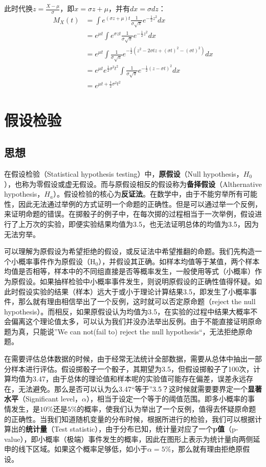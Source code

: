 \documentclass[11pt]{article}
\begin{document}
此时代换$z=\frac{X-\mu}{\sigma}$，即$x= \sigma z + \mu$，并有$dx=\sigma dz$：
\begin{align*}
    M_X(t) &= \int e^{(\sigma z + \mu)t} \frac{1}{\sigma\sqrt{\pi}} e^{-\frac{1}{2}z^2}dx \\
    &= e^{\mu t} \int e^{\sigma z t} \frac{1}{\sigma\sqrt{\pi}} e^{-\frac{1}{2}z^2}dx \\
    &= e^{\mu t} \int \frac{1}{\sigma\sqrt{\pi}} e^{-\frac{1}{2} (z^2 -2\sigma t z + (\sigma t)^2 -(\sigma t)^2)}dx \\
    &= e^{\mu t} e^{\frac{1}{2} \sigma^2 t^2} \int \frac{1}{\sigma\sqrt{\pi}} e^{-\frac{1}{2} (z - \sigma t)^2}dx \\
    &= e^{\mu t + \frac{1}{2} \sigma^2 t^2}
\end{align*}

\section{假设检验}

\subsection{思想}

在假设检验（Statistical hypothesis testing）中，\textbf{原假设}（Null hypothesis，$H_0$），也称为零假设或虚无假设。而与原假设相反的假设称为\textbf{备择假设}（Althernative hypothesis，$H_a$）。假设检验的核心为\textbf{反证法}。在数学中，由于不能穷举所有可能性，因此无法通过举例的方式证明一个命题的正确性。但是可以通过举一个反例，来证明命题的错误。在掷骰子的例子中，在每次掷的过程相当于一次举例，假设进行了上万次的实验，即便实验结果均值为3.5，也无法证明总体的均值为3.5，因为无法穷举。

可以理解为原假设为希望拒绝的假设，或反证法中希望推翻的命题。我们先构造一个小概率事件作为原假设（$\text{H}_0$），并假设其正确。如样本均值等于某值，两个样本均值是否相等，样本中的不同组直接是否等概率发生，一般使用等式（小概率）作为原假设。如果抽样检验中小概率事件发生，则说明原假设的正确性值得怀疑。如此时假设实验的结果（样本）远大于或小于理论计算结果3.5，即发生了小概率事件，那么就有理由相信举出了一个反例，这时就可以否定原命题（reject the null hypothesis）。而相反，如果原假设认为均值为3.5，在实验的过程中结果大概率不会偏离这个理论值太多，可以认为我们并没办法举出反例。由于不能直接证明原命题为真，只能说”We can not(fail to) reject the null hypothesis“，无法拒绝原命题。

在需要评估总体数据的时候，由于经常无法统计全部数据，需要从总体中抽出一部分样本进行评估。假设掷骰子一个骰子，其期望为3.5，但假设掷骰子了100次，计算均值为3.47，由于总体的理论值和样本呢的实验值可能存在偏差，误差永远存在，无法避免。那么是否可以认为么3.47“等于”3.5？这时候就需要要界定一个\textbf{显著水平}（Significant level，$\alpha$），相当于设定一个等于的阈值范围。即多小概率的事情发生，是$10\%$还是$5\%$的概率，使我们认为举出了一个反例，值得去怀疑原命题的正确性。当我们知道随机变量的分布时候，根据所进行的检验，我们可以根据计算出的\textbf{统计量}（Test statistic），由于分布已知，统计量对应了一个\textbf{p值}（p-value），即小概率（极端）事件发生的概率，因此在图形上表示为统计量向两侧延申的线下区域。如果这个概率足够低，如小于$\alpha=5\%$，那么就有理由拒绝原假设。
\end{document}
